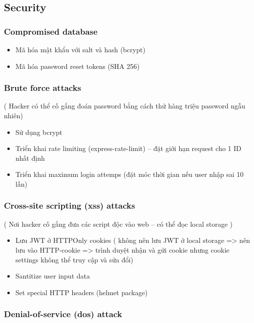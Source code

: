 \subsection{Security}

\subsubsection{Compromised database}

\begin{itemize}
\item Mã hóa mật khẩu với salt và hash (bcrypt)
\item Mã hóa password reset tokens (SHA 256)
\end{itemize}

\subsubsection{Brute force attacks}

( Hacker có thể cố gắng đoán password bằng cách thử hàng triệu password ngẫu nhiên)

\begin{itemize}
\item Sử dụng bcrypt
\item Triển khai rate limiting (express-rate-limit) – đặt giới hạn request cho 1 ID nhất định
\item Triển khai maximum login attemps (đặt móc thời gian nếu user nhập sai 10 lần)
\end{itemize}

\subsubsection{Cross-site scripting (xss) attacks }
( Nơi hacker cố gắng đưa các script độc vào web – có thể đọc local storage )

\begin{itemize}
\item Lưu JWT ở  HTTPOnly cookies
( không nên lưu JWT ở local storage => nên lưu vào HTTP-cookie => trình duyệt nhận và gửi cookie nhưng cookie settings không thể truy cập và sửa đổi)
\item Santitize user input data
\item Set special HTTP headers (helmet package)
\end{itemize}

\subsubsection{Denial-of-service (dos) attack}

